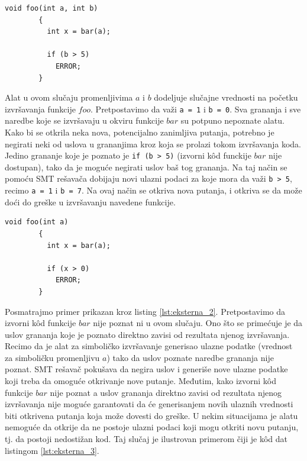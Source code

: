 \documentclass[12pt,oneside]{memoir}
\begin{document}
\bigbreak
    \begin{lstlisting}[caption={Primer gde rezultat izvršavanja eksterne funkcije nije važan},captionpos=b,label={lst:eksterna_1}]
        void foo(int a, int b)
        {
          int x = bar(a);
          
          if (b > 5)
            ERROR;
        }
    \end{lstlisting}
\bigbreak

Alat u ovom slučaju promenljivima $a$ i $b$ dodeljuje slučajne vrednosti na početku izvršavanja funkcije $foo$. Pretpostavimo da važi \texttt{a = 1} i \texttt{b = 0}. Sva grananja i sve naredbe koje se izvršavaju u okviru funkcije $bar$ su potpuno nepoznate alatu. Kako bi se otkrila neka nova, potencijalno zanimljiva putanja, potrebno je negirati neki od uslova u grananjima kroz koja se prolazi tokom izvršavanja koda. Jedino grananje koje je poznato je \texttt{if (b > 5)} (izvorni k\^od funckije $bar$ nije dostupan), tako da je moguće negirati uslov baš tog grananja. Na taj način se pomoću SMT rešavača dobijaju novi ulazni podaci za koje mora da važi \texttt{b > 5}, recimo \texttt{a = 1} i \texttt{b = 7}. Na ovaj način se otkriva nova putanja, i otkriva se da može doći do greške u izvršavanju navedene funkcije.

\bigbreak
    \begin{lstlisting}[caption={Primer gde je rezultat izvršavanja eksterne funkcije važan},captionpos=b,label={lst:eksterna_2}]
        void foo(int a)
        {
          int x = bar(a);
          
          if (x > 0)
            ERROR;
        }
    \end{lstlisting}
\bigbreak

Posmatrajmo primer prikazan kroz listing \ref{lst:eksterna_2}. Pretpostavimo da izvorni k\^od funkcije $bar$ nije poznat ni u ovom slučaju. Ono što se primećuje je da uslov grananja koje je poznato direktno zavisi od rezultata njenog izvršavanja. Recimo da je alat za simboličko izvršavanje generisao ulazne podatke (vrednost za simboličku promenljivu $a$) tako da uslov poznate naredbe grananja nije poznat. SMT rešavač pokušava da negira uslov i generiše nove ulazne podatke koji treba da omoguće otkrivanje nove putanje. Međutim, kako izvorni k\^od funkcije $bar$ nije poznat a uslov grananja direktno zavisi od rezultata njenog izvršavanja nije moguće garantovati da će generisanjem novih ulaznih vrednosti biti otkrivena putanja koja može dovesti do greške. U nekim situacijama je alatu nemoguće da otkrije da ne postoje ulazni podaci koji mogu otkriti novu putanju, tj. da postoji nedostižan kod. Taj slučaj je ilustrovan primerom čiji je k\^od dat listingom \ref{lst:eksterna_3}.
\end{document}
